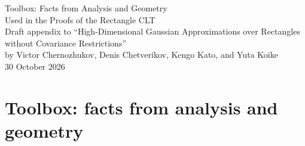 \documentclass[11pt,letterpaper]{article}
\theoremstyle{plain}
\begin{document}
\begin{center}
{\Large Toolbox: Facts from Analysis and Geometry\\[0.15em]
Used in the Proofs of the Rectangle CLT}\\[0.85em]
{\normalsize Draft appendix to ``High-Dimensional Gaussian Approximations over
Rectangles without Covariance Restrictions''\\
by Victor Chernozhukov, Denis Chetverikov, Kengo Kato, and Yuta Koike}\\[0.65em]
{\normalsize 30 October 2026}
\end{center}
\bigskip

\appendix
\setcounter{section}{7}
%   

\makeatletter
\providecommand{\E}{\mathbb E}
\providecommand{\Pp}{\mathbb P}
\providecommand{\R}{\mathbb R}
\providecommand{\tr}{\operatorname{tr}}
\providecommand{\op}{\mathrm{op}}
\providecommand{\norm}[1]{\left\lVert#1\right\rVert}
\providecommand{\ind}{\mathbf 1}
\providecommand{\dd}{\,d}
\providecommand{\Hh}{H_2}
\providecommand{\surf}{\mathcal J}
\providecommand{\relint}{\operatorname{relint}}
\providecommand{\aff}{\operatorname{aff}}
\providecommand{\cone}{\operatorname{cone}}
\providecommand{\dist}{\operatorname{dist}}
\providecommand{\prj}{\operatorname{pr}}
\providecommand{\Haus}{\mathcal H}
\providecommand{\TBc}[1]{[#1]}
\providecommand{\PN}[2]{\ifdefined\toolboxinpaper\ref{#1}\else#2\fi}
\providecommand{\PR}[3]{#1~\PN{#2}{#3}}
\providecommand{\PE}[2]{(\PN{#1}{#2})}
\providecommand{\usedin}[1]{\par\smallskip\noindent{\small\emph{Used in:} #1}\par\smallskip}
\makeatother

\section{Toolbox: facts from analysis and geometry}\label{app:toolbox}
\end{document}
